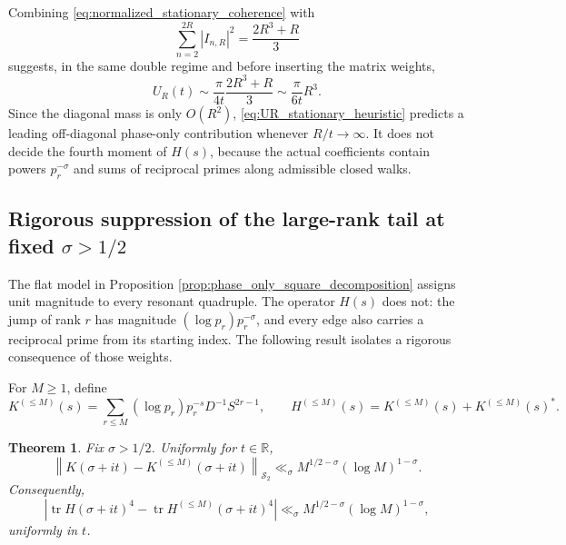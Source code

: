 \documentclass[11pt]{amsart}
\numberwithin{equation}{section}
\theoremstyle{plain}
\newtheorem{theorem}{Theorem}[section]
\theoremstyle{definition}
\theoremstyle{remark}
\newcommand{\R}{\mathbb R}
\newcommand{\HS}{\mathcal S_2}
\newcommand{\tr}{\operatorname{tr}}
\begin{document}
Combining \eqref{eq:normalized_stationary_coherence} with
\begin{equation}
\sum_{n=2}^{2R}|I_{n,R}|^2=\frac{2R^3+R}{3}
\label{eq:ways_square_identity}
\end{equation}
suggests, in the same double regime and before inserting the matrix weights,
\begin{equation}
U_R(t)
\sim
\frac{\pi}{4t}\frac{2R^3+R}{3}
\sim
\frac{\pi}{6t}R^3.
\label{eq:UR_stationary_heuristic}
\end{equation}
Since the diagonal mass is only $O(R^2)$, \eqref{eq:UR_stationary_heuristic} predicts a leading off-diagonal phase-only contribution whenever $R/t\to\infty$.  It does not decide the fourth moment of $H(s)$, because the actual coefficients contain powers $p_r^{-\sigma}$ and sums of reciprocal primes along admissible closed walks.

\subsection{Rigorous suppression of the large-rank tail at fixed \texorpdfstring{$\sigma>1/2$}{sigma > 1/2}}
\label{subsec:weighted_tail_suppression}

The flat model in Proposition \ref{prop:phase_only_square_decomposition} assigns unit magnitude to every resonant quadruple.  The operator $H(s)$ does not: the jump of rank $r$ has magnitude $(\log p_r)p_r^{-\sigma}$, and every edge also carries a reciprocal prime from its starting index.  The following result isolates a rigorous consequence of those weights.

For $M\ge1$, define
\begin{equation}
K^{(\le M)}(s)
=
\sum_{r\le M}(\log p_r)p_r^{-s}D^{-1}S^{2r-1},
\qquad
H^{(\le M)}(s)=K^{(\le M)}(s)+K^{(\le M)}(s)^*.
\label{eq:rank_truncated_operators}
\end{equation}

\begin{theorem}
\label{thm:weighted_rank_tail}
Fix $\sigma>1/2$.  Uniformly for $t\in\R$,
\begin{equation}
\left\|K(\sigma+it)-K^{(\le M)}(\sigma+it)\right\|_{\HS}
\ll_{\sigma}
M^{1/2-\sigma}(\log M)^{1-\sigma}.
\label{eq:K_rank_tail_bound}
\end{equation}
Consequently,
\begin{equation}
\left|
\tr H(\sigma+it)^4
-
\tr H^{(\le M)}(\sigma+it)^4
\right|
\ll_{\sigma}
M^{1/2-\sigma}(\log M)^{1-\sigma},
\label{eq:fourth_moment_rank_tail_bound}
\end{equation}
uniformly in $t$.
\end{theorem}
\end{document}
